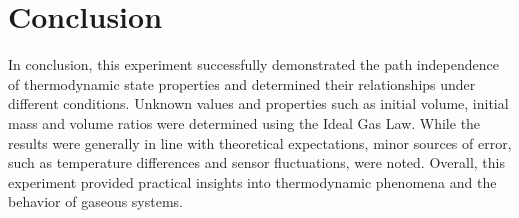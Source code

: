 \documentclass[12pt]{article}
\begin{document}
\section*{Conclusion}
In conclusion, this experiment successfully demonstrated the path independence of thermodynamic state properties and determined their relationships under different conditions. Unknown values and properties such as initial volume, initial mass and volume ratios were determined using the Ideal Gas Law. While the results were generally in line with theoretical expectations, minor sources of error, such as temperature differences and sensor fluctuations, were noted. Overall, this experiment provided practical insights into thermodynamic phenomena and the behavior of gaseous systems.
\printbibliography
\end{document}
